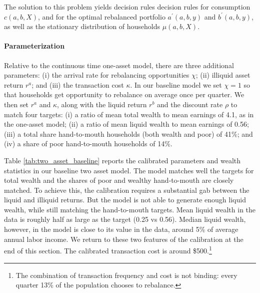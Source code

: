 The solution to this problem yields decision rules decision rules for consumption $c\left( a,b,X\right)$, and for the optimal rebalanced portfolio $a^{\prime }\left( a,b,y\right) $ and $b^{\prime }\left( a,b,y\right)$, as well as the stationary distribution of households $\mu \left( a,b,X\right) $. 

\paragraph{Parameterization} \label{sec:two_asset_param}
Relative to the continuous time one-asset model, there are three additional parameters: (i) the arrival rate for rebalancing opportunities $\chi$; (ii) illiquid asset return $r^a$; and (iii) the transaction cost $\kappa$. In our baseline model we set $\chi=1$ so that households get opportunity to rebalance on average once per quarter. We then set $r^a$ and $\kappa$, along with the liquid return $r^b$ and the discount rate $\rho$ to match four targets: (i) a ratio of mean total wealth to mean earnings of 4.1, as in the one-asset model; (ii) a ratio of mean liquid wealth to mean earnings of 0.56; (iii) a total share hand-to-mouth households (both wealth and poor) of 41\%;  and (iv) a share of poor hand-to-mouth households of 14\%. 


Table \ref{tab:two_asset_baseline} reports the calibrated parameters and wealth statistics in our baseline two asset model. The model matches well the targets for total wealth and the shares of poor and wealthy hand-to-mouth are closely matched. To achieve this, the calibration requires a substantial gab between the liquid and illiquid returns. But the model is not able to generate enough liquid wealth, while still matching the hand-to-mouth targets. Mean liquid wealth in the data is roughly half as large as the target (0.25 vs 0.56). Median liquid wealth, however, in the model is close to its value in the data, around 5\% of average annual labor income. We return to these two features of the calibration at the end of this section. The calibrated transaction cost is around \$500.\footnote{The combination of transaction frequency and cost is not binding: every quarter 13\% of the population chooses to rebalance.}  

